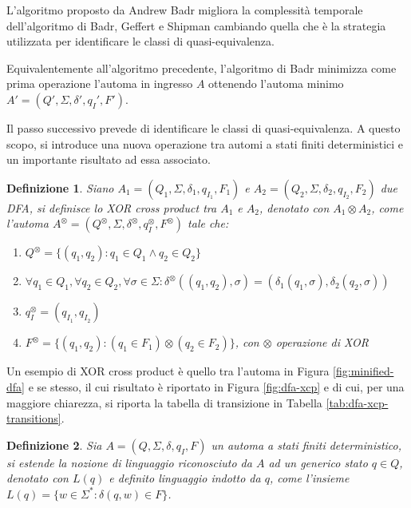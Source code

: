 \documentclass[a4paper,12pt]{report} %
\newtheorem{definition}{Definizione}[chapter] %
\begin{document}
L'algoritmo proposto da Andrew Badr \parencite{Badr} migliora la complessità temporale dell'algoritmo
di Badr, Geffert e Shipman cambiando quella che è la strategia utilizzata per identificare le classi di
quasi-equivalenza.

Equivalentemente all'algoritmo precedente, l'algoritmo di Badr minimizza come prima operazione l'automa
in ingresso $A$ ottenendo l'automa minimo $A' = (Q', \Sigma, \delta', q_I', F')$.

Il passo successivo prevede di identificare le classi di quasi-equivalenza. A questo scopo, si introduce
una nuova operazione tra automi a stati finiti deterministici e un importante risultato ad essa associato.

\begin{definition}
  Siano $A_1 = (Q_1, \Sigma, \delta_1, q_{I_1}, F_1)$ e $A_2 = (Q_2, \Sigma, \delta_2, q_{I_2}, F_2)$ due DFA,
  si definisce lo \emph{XOR cross product} tra $A_1$ e $A_2$, denotato con $A_1 \otimes A_2$, come l'automa 
  $A^\otimes = (Q^\otimes, \Sigma, \delta^\otimes, q_{I}^\otimes, F^\otimes)$ tale che:
  \begin{enumerate}
    \item $Q^\otimes = \{ (q_1, q_2) : q_1 \in Q_1 \wedge q_2 \in Q_2 \}$
    \item $\forall q_1 \in Q_1, \forall q_2 \in Q_2, \forall \sigma \in \Sigma : \delta^\otimes((q_1, q_2), \sigma) = (\delta_1(q_1, \sigma), \delta_2(q_2, \sigma))$
    \item $q_{I}^\otimes = (q_{I_1}, q_{I_2})$
    \item $F^\otimes = \{ (q_1, q_2) : (q_1 \in F_1) \otimes (q_2 \in F_2) \}$, con $\otimes$ operazione di XOR
  \end{enumerate}
\end{definition}

Un esempio di XOR cross product è quello tra l'automa in Figura \ref{fig:minified-dfa} e se stesso, il cui
risultato è riportato in Figura \ref{fig:dfa-xcp} e di cui, per una maggiore chiarezza, si riporta la tabella
di transizione in Tabella \ref{tab:dfa-xcp-transitions}.

\begin{definition}
  Sia $A = (Q, \Sigma, \delta, q_I, F)$ un automa a stati finiti deterministico, si estende la nozione
  di linguaggio riconosciuto da $A$ ad un generico stato $q \in Q$, denotato con $L(q)$ e definito \emph{linguaggio
  indotto} da $q$, come l'insieme $L(q) = \{ w \in \Sigma^* : \delta(q, w) \in F \}$.
\end{definition}
\end{document}
